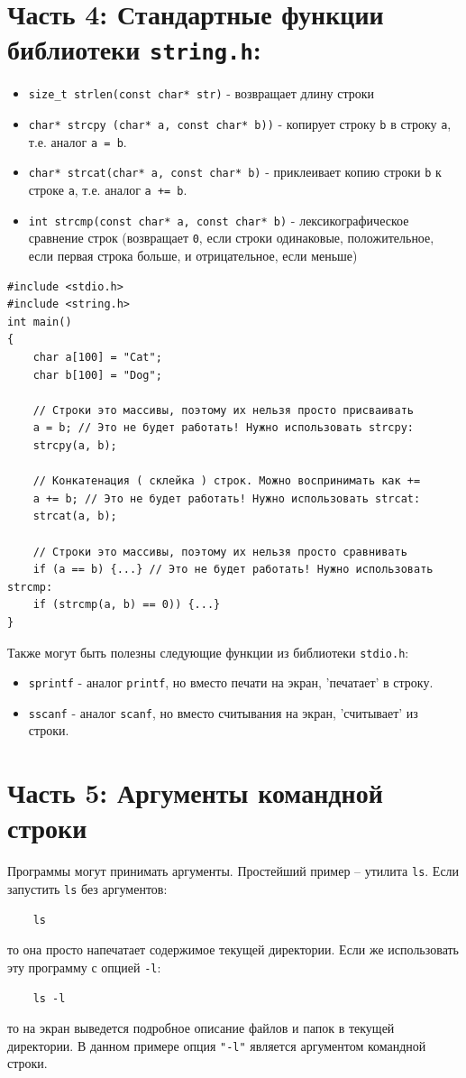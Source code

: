 \documentclass{article}
\begin{document}
\section*{Часть 4: Стандартные функции библиотеки \texttt{string.h}:}
\begin{itemize}
\item \texttt{size\_t strlen(const char* str)} - возвращает длину строки
\item \texttt{char* strcpy (char* a, const char* b))} - копирует строку \texttt{b} в строку \texttt{a}, т.е. аналог \texttt{a = b}.
\item \texttt{char* strcat(char* a, const char* b)} - приклеивает копию строки \texttt{b} к строке \texttt{a}, т.е. аналог \texttt{a += b}.
\item \texttt{int strcmp(const char* a, const char* b)} - лексикографическое сравнение строк (возвращает \texttt{0}, если строки одинаковые, положительное, если первая строка больше, и отрицательное, если меньше)
\end{itemize}
\begin{lstlisting}
#include <stdio.h>
#include <string.h>
int main() 
{
    char a[100] = "Cat";
    char b[100] = "Dog";
	
    // Строки это массивы, поэтому их нельзя просто присваивать 
    a = b; // Это не будет работать! Нужно использовать strcpy:
    strcpy(a, b);
    
    // Конкатенация ( склейка ) строк. Можно воспринимать как +=
    a += b; // Это не будет работать! Нужно использовать strcat:
    strcat(a, b);
	
    // Строки это массивы, поэтому их нельзя просто сравнивать
    if (a == b) {...} // Это не будет работать! Нужно использовать strcmp:
    if (strcmp(a, b) == 0)) {...} 
}
\end{lstlisting}


Также могут быть полезны следующие функции из библиотеки \texttt{stdio.h}:
\begin{itemize}
\item \texttt{sprintf} - аналог \texttt{printf}, но вместо печати на экран, 'печатает' в строку.
\item \texttt{sscanf} - аналог \texttt{scanf}, но вместо считывания на экран, 'считывает' из строки.
\end{itemize}


\newpage

\section*{Часть 5: Аргументы командной строки}
Программы могут принимать аргументы. Простейший пример -- утилита \texttt{ls}. Если запустить \texttt{ls} без аргументов:
\begin{verbatim}
    ls
\end{verbatim}
то она просто напечатает содержимое текущей директории.  Если же использовать эту программу с опцией \texttt{-l}: 
\begin{verbatim}
    ls -l
\end{verbatim}
то на экран выведется подробное описание файлов и папок в текущей директории. В данном примере опция \texttt{"-l"} является аргументом командной строки. \\
\end{document}
